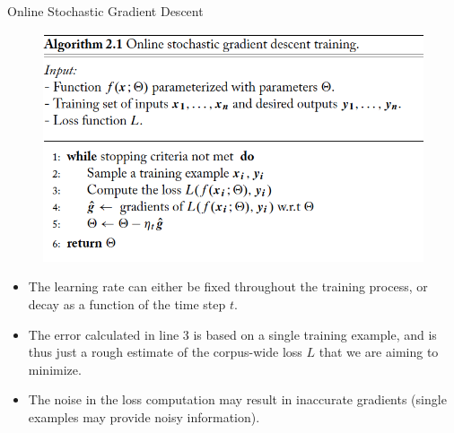\documentclass[handout]{beamer}
\begin{document}
\begin{frame}{Online Stochastic Gradient Descent}


\begin{figure}[htb]
	\centering
	 \includegraphics[scale=0.3]{pics/Online-SGD.png}
\end{figure}

\begin{scriptsize}
\begin{itemize}
\item The learning rate can either be fixed throughout the
training process, or decay as a function of the time step $t$.
\item  The error calculated in line 3 is based on a single training example, and is thus just a rough estimate of the corpus-wide loss $L$ that we are aiming to minimize. 
\item The noise in the loss computation may result in inaccurate gradients (single examples may provide noisy information).

\end{itemize}


\end{scriptsize}


\end{frame}
\end{document}

